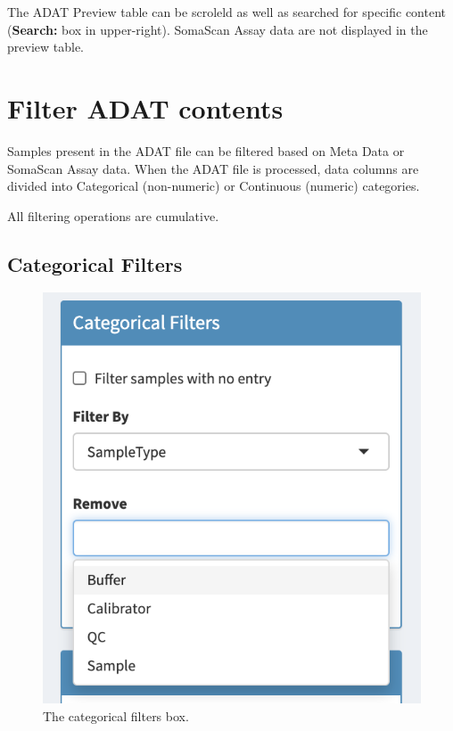\documentclass[
]{book}
\begin{document}
The ADAT Preview table can be scroleld as well as searched for specific content (\textbf{Search:} box in upper-right). SomaScan Assay data are not displayed in the preview table.

\hypertarget{filter-adat-contents}{%
\section{Filter ADAT contents}\label{filter-adat-contents}}

Samples present in the ADAT file can be filtered based on Meta Data or SomaScan Assay data. When the ADAT file is processed, data columns are divided into Categorical (non-numeric) or Continuous (numeric) categories.

All filtering operations are cumulative.

\hypertarget{categorical-filters}{%
\subsection{Categorical Filters}\label{categorical-filters}}

\begin{figure}
\centering
\includegraphics{images/CategoricalFilters.png}
\caption{The categorical filters box.}
\end{figure}
\end{document}
